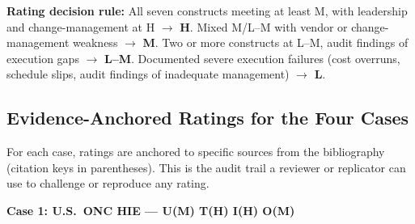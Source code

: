 \noindent\textbf{Rating decision rule:}
All seven constructs meeting at least M, with leadership and change-management at H $\rightarrow$ \textbf{H}.
Mixed M/L--M with vendor or change-management weakness $\rightarrow$ \textbf{M}.
Two or more constructs at L--M, audit findings of execution gaps $\rightarrow$ \textbf{L--M}.
Documented severe execution failures (cost overruns, schedule slips, audit findings of inadequate management) $\rightarrow$ \textbf{L}.

\bigskip


\subsection*{Evidence-Anchored Ratings for the Four Cases}

\noindent For each case, ratings are anchored to specific sources from the bibliography
(citation keys in parentheses). This is the audit trail a reviewer or replicator can
use to challenge or reproduce any rating.

\medskip

\noindent\textbf{Case 1: U.S.\ ONC HIE --- U(M) T(H) I(H) O(M)}

